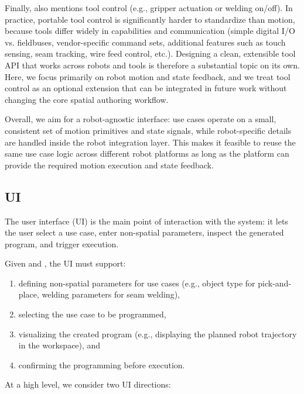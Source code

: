 Finally,  also mentions tool control (e.g., gripper actuation or welding on/off). In practice, portable tool control is significantly harder to standardize than motion, because tools differ widely in capabilities and communication (simple digital I/O vs. fieldbuses, vendor-specific command sets, additional features such as touch sensing, seam tracking, wire feed control, etc.). Designing a clean, extensible tool API that works across robots and tools is therefore a substantial topic on its own. Here, we focus primarily on robot motion and state feedback, and we treat tool control as an optional extension that can be integrated in future work without changing the core spatial authoring workflow.

Overall, we aim for a robot-agnostic interface: use cases operate on a small, consistent set of motion primitives and state signals, while robot-specific details are handled inside the robot integration layer. This makes it feasible to reuse the same use case logic across different robot platforms as long as the platform can provide the required motion execution and state feedback.

\subsection{UI} \label{subsec:ch2_analysis_ui}

The user interface (UI) is the main point of interaction with the system: it lets the user select a use case, enter non-spatial parameters, inspect the generated program, and trigger execution.

Given  and , the UI must support:
\begin{enumerate}[label=(\roman*)]
    \item defining non-spatial parameters for use cases (e.g., object type for pick-and-place, welding parameters for seam welding),
    \item selecting the use case to be programmed,
    \item visualizing the created program (e.g., displaying the planned robot trajectory in the workspace), and
    \item confirming the programming before execution.
\end{enumerate}

At a high level, we consider two UI directions:

